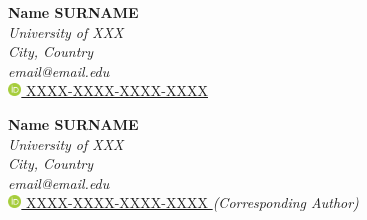 \documentclass[a4paper]{article}
\begin{document}
\begin{multicols}{3}
    \columnbreak

    \textbf{Name SURNAME}\\
    \textit{University of XXX}\\
    \textit{City, Country}\\
    \textit{email@email.edu}\\
    \href{https://orcid.org/XXXX-XXXX-XXXX-XXXX}{%
    \includegraphics[width=10pt]{orcid.png}
    XXXX-XXXX-XXXX-XXXX
	}  
    \vfill

    \textbf{Name SURNAME}\\
    \textit{University of XXX}\\
    \textit{City, Country}\\
    \textit{email@email.edu}\\
    \href{https://orcid.org/XXXX-XXXX-XXXX-XXXX}{%
    \includegraphics[width=10pt]{orcid.png}
    XXXX-XXXX-XXXX-XXXX
	}
    \textit{(Corresponding Author)}\\
    \vfill
\end{multicols}

\singlespacing
\setlength{\parskip}{6pt}
\setlength{\parindent}{0.5cm}
\end{document}
